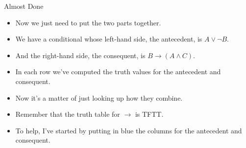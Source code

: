 \documentclass[
  ignorenonframetext,
]{beamer}
\providecommand{\tightlist}{%
  \setlength{\itemsep}{0pt}\setlength{\parskip}{0pt}}
\renewcommand{\,}{\text{, }}
\begin{document}
\begin{frame}{Almost Done}
\protect\hypertarget{almost-done}{}

\begin{itemize}
\tightlist
\item
  Now we just need to put the two parts together.
\item
  We have a conditional whose left-hand side, the antecedent, is
  \(A \vee \neg B\).
\item
  And the right-hand side, the consequent, is
  \(B \rightarrow (A \wedge C)\).
\item
  In each row we've computed the truth values for the antecedent and
  consequent.
\item
  Now it's a matter of just looking up how they combine.
\item
  Remember that the truth table for \(\rightarrow\) is TFTT.
\item
  To help, I've started by putting in blue the columns for the
  antecedent and consequent.
\end{itemize}

\end{frame}
\end{document}
